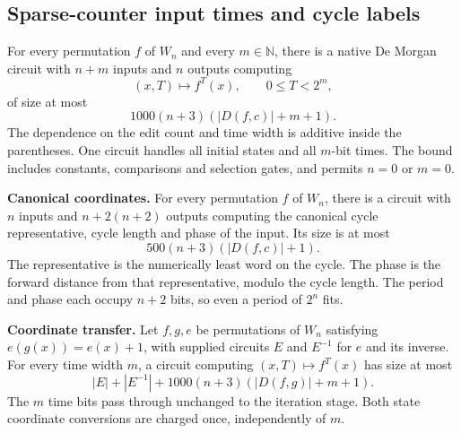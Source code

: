 \begin{result}
\subsection{Sparse-counter input times and cycle labels}
For every permutation $f$ of $W_n$ and every $m\in\mathbb N$, there is a native
De Morgan circuit with $n+m$ inputs and $n$ outputs computing
\[
(x,T)\longmapsto f^T(x),\qquad 0\leq T<2^m,
\]
of size at most
\[
1000(n+3)(|D(f,c)|+m+1).
\]
The dependence on the edit count and time width is additive inside the
parentheses. One circuit handles all initial states and all $m$-bit times.
The bound includes constants, comparisons and selection gates, and permits
$n=0$ or $m=0$.

\end{result}

\begin{result}
\textbf{Canonical coordinates.}
For every permutation $f$ of $W_n$, there is a circuit with $n$ inputs and
$n+2(n+2)$ outputs computing the canonical cycle representative, cycle length
and phase of the input. Its size is at most
\[
500(n+3)(|D(f,c)|+1).
\]
The representative is the numerically least word on the cycle. The phase is
the forward distance from that representative, modulo the cycle length.
The period and phase each occupy $n+2$ bits, so even a period of $2^n$ fits.

\end{result}

\begin{result}
\textbf{Coordinate transfer.}
Let $f,g,e$ be permutations of $W_n$ satisfying $e(g(x))=e(x)+1$, with supplied
circuits $E$ and $E^{-1}$ for $e$ and its inverse. For every time width $m$, a
circuit computing $(x,T)\mapsto f^T(x)$ has size at most
\[
|E|+|E^{-1}|+1000(n+3)(|D(f,g)|+m+1).
\]
The $m$ time bits pass through unchanged to the iteration stage. Both state
coordinate conversions are charged once, independently of $m$.
\end{result}

